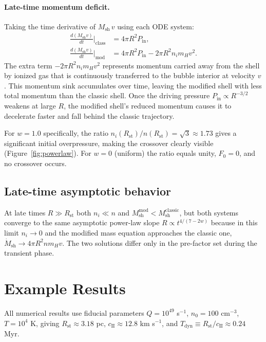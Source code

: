\documentclass[12pt]{article}
\begin{document}
\paragraph{Late-time momentum deficit.}
Taking the time derivative of $M_\mathrm{sh}\,v$ using each ODE system:
\begin{align}
  \frac{d(M_\mathrm{sh}v)}{dt}\bigg|_\mathrm{class}
    &= 4\pi R^2 P_\mathrm{in}, \\
  \frac{d(M_\mathrm{sh}v)}{dt}\bigg|_\mathrm{mod}
    &= 4\pi R^2 P_\mathrm{in} - 2\pi R^2 n_i m_H v^2.
\end{align}
The extra term $-2\pi R^2 n_i m_H v^2$ represents momentum carried away from
the shell by ionized gas that is continuously transferred to the bubble
interior at velocity $v$.  This momentum sink accumulates over time,
leaving the modified shell with less total momentum than the classic shell.
Once the driving pressure $P_\mathrm{in}\propto R^{-3/2}$ weakens at large
$R$, the modified shell's reduced momentum causes it to decelerate faster and
fall behind the classic trajectory.

For $w=1.0$ specifically, the ratio
$n_i(R_\mathrm{st})/n(R_\mathrm{st}) = \sqrt{3} \approx 1.73$ gives a
significant initial overpressure, making the crossover clearly visible
(Figure~\ref{fig:powerlaw}).  For $w=0$ (uniform) the ratio equals unity,
$F_0=0$, and no crossover occurs.

\subsection{Late-time asymptotic behavior}

At late times $R \gg R_\mathrm{st}$ both $n_i \ll n$ and
$M_\mathrm{sh}^\mathrm{mod} < M_\mathrm{sh}^\mathrm{classic}$, but both
systems converge to the same asymptotic power-law slope
$R\propto t^{4/(7-2w)}$ because in this limit $n_i \to 0$ and the modified
mass equation approaches the classic one, $\dot{M}_\mathrm{sh} \to 4\pi R^2
n m_H v$.  The two solutions differ only in the pre-factor set during the
transient phase.

\section{Example Results}
\label{sec:results}

All numerical results use fiducial parameters $Q=10^{49}$ s$^{-1}$,
$n_0=100$ cm$^{-3}$, $T=10^4$ K, giving $R_\mathrm{st}\approx 3.18$ pc,
$c_\mathrm{II}\approx 12.8$ km s$^{-1}$, and
$T_\mathrm{dyn}\equiv R_\mathrm{st}/c_\mathrm{II}\approx 0.24$ Myr.
\end{document}
